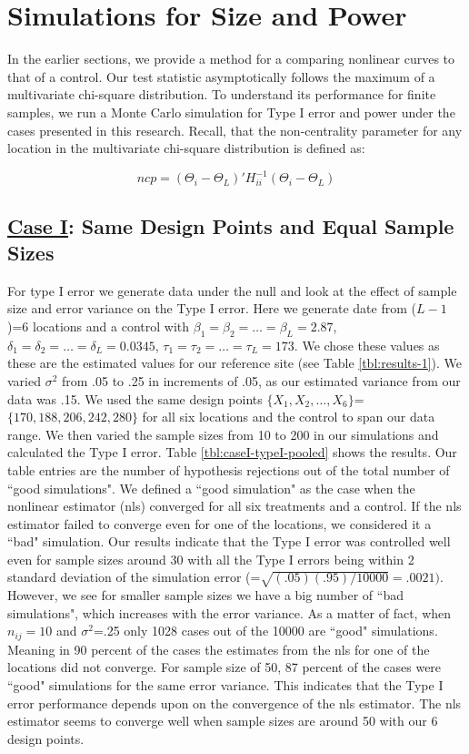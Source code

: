 \documentclass[useAMS]{cJAS2e}
\begin{document}
\section{Simulations for Size and Power}\label{sec:sims}
In the earlier sections, we provide a method for a comparing nonlinear curves to that of a control.  Our test statistic asymptotically follows the maximum of a multivariate chi-square distribution.  To understand its performance for finite samples, we run a Monte Carlo simulation for Type I error and power under the cases presented in this research.  Recall, that the non-centrality parameter for any location in the multivariate chi-square distribution is defined as:

\begin{equation}\label{eqn:case-i-location-ncp}
	ncp = (\Theta_i - \Theta_L)' H_{ii}^{-1} (\Theta_i - \Theta_L)
\end{equation}

\subsection*{\underline{Case I}: Same Design Points and Equal Sample Sizes}
For type I error we generate data under the null and look at the effect of sample size and error variance on the Type I error.  Here we generate date from ($L-1$)=6 locations and a control with $\beta_1 = \beta_2 = \ldots = \beta_L = 2.87$, $\delta_1 = \delta_2 = \ldots = \delta_L = 0.0345$, $\tau_1 = \tau_2 = \ldots = \tau_L = 173$.  We chose these values as these are the estimated values for our reference site (see Table \ref{tbl:results-1}). We varied $\sigma^2$ from .05 to .25 in increments of .05, as our estimated variance from our data was .15.  We used the same design points $\{X_1 , X_2, \ldots, X_6\}$=$\{170, 188, 206, 242, 280\}$ for all six locations and the control to span our data range.  We then varied the sample sizes from 10 to 200 in our simulations and calculated the Type I error.   Table \ref{tbl:caseI-typeI-pooled} shows the results.  Our table entries are the number of hypothesis rejections out of the total number of ``good simulations".  We defined a ``good simulation" as the case when the nonlinear estimator (nls) converged for all six treatments and a control.  If the nls estimator failed to converge even for one of the locations, we considered it a ``bad" simulation.  Our results indicate that the Type I error was controlled well even for sample sizes around 30 with all the Type I errors being within 2 standard deviation of the simulation error (=$\sqrt{(.05)(.95)/10000}=.0021)$.  However, we see for smaller sample sizes we have a big number of ``bad simulations", which increases with the error variance.  As a matter of fact, when $n_{ij}=10$ and $\sigma^2$=.25 only 1028 cases out of the 10000 are ``good" simulations.  Meaning in 90 percent of the cases the estimates from the nls for one of the locations did not converge.  For sample size of 50, 87 percent of the cases were ``good" simulations for the same error variance.  This indicates that the Type I error performance depends upon on the convergence of the nls estimator.  The nls estimator seems to converge well when sample sizes are around 50 with our 6 design points.
\end{document}
